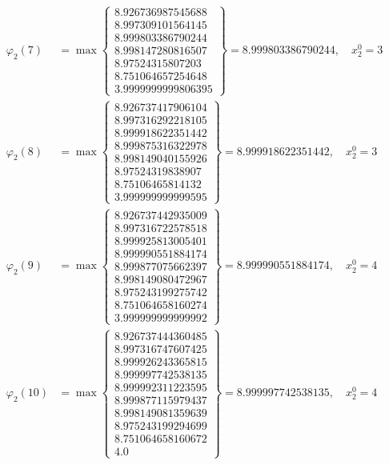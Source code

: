 \documentclass{article}
\begin{document}
\begin{align*}
  
  
  
\varphi_{2}(7) &= \max \left\{ \begin{array}{c}
8.926736987545688 \\
 8.997309101564145 \\
 8.999803386790244 \\
 8.998147280816507 \\
 8.97524315807203 \\
 8.751064657254648 \\
 3.9999999999806395
\end{array} \right\} = 8.999803386790244, \quad x_{2}^0 = 3\\
  
  
  
  
\varphi_{2}(8) &= \max \left\{ \begin{array}{c}
8.926737417906104 \\
 8.997316292218105 \\
 8.999918622351442 \\
 8.999875316322978 \\
 8.998149040155926 \\
 8.97524319838907 \\
 8.75106465814132 \\
 3.999999999999595
\end{array} \right\} = 8.999918622351442, \quad x_{2}^0 = 3\\
  
  
  
  
\varphi_{2}(9) &= \max \left\{ \begin{array}{c}
8.926737442935009 \\
 8.997316722578518 \\
 8.999925813005401 \\
 8.999990551884174 \\
 8.999877075662397 \\
 8.998149080472967 \\
 8.975243199275742 \\
 8.751064658160274 \\
 3.999999999999992
\end{array} \right\} = 8.999990551884174, \quad x_{2}^0 = 4\\
  
  
  
  
\varphi_{2}(10) &= \max \left\{ \begin{array}{c}
8.926737444360485 \\
 8.997316747607425 \\
 8.999926243365815 \\
 8.999997742538135 \\
 8.999992311223595 \\
 8.999877115979437 \\
 8.998149081359639 \\
 8.975243199294699 \\
 8.751064658160672 \\
 4.0
\end{array} \right\} = 8.999997742538135, \quad x_{2}^0 = 4\\
  

\end{align*}
\end{document}
